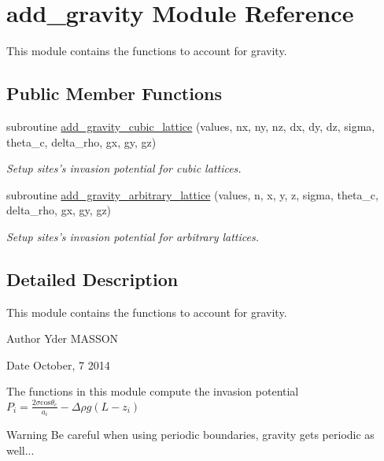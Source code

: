 \hypertarget{classadd__gravity}{
\section{add\-\_\-gravity \-Module \-Reference}
\label{classadd__gravity}
}


\-This module contains the functions to account for gravity.  


\subsection*{\-Public \-Member \-Functions}
\begin{DoxyCompactItemize}
\item 
subroutine \hyperlink{classadd__gravity_a6702f1e868d3906adf42156334fb1d69}{add\-\_\-gravity\-\_\-cubic\-\_\-lattice} (values, nx, ny, nz, dx, dy, dz, sigma, theta\-\_\-c, delta\-\_\-rho, gx, gy, gz)
\begin{DoxyCompactList}\small\item\em \-Setup sites's invasion potential for cubic lattices. \end{DoxyCompactList}\item 
subroutine \hyperlink{classadd__gravity_ad37593bf81aade45d5d57e92da031558}{add\-\_\-gravity\-\_\-arbitrary\-\_\-lattice} (values, n, x, y, z, sigma, theta\-\_\-c, delta\-\_\-rho, gx, gy, gz)
\begin{DoxyCompactList}\small\item\em \-Setup sites's invasion potential for arbitrary lattices. \end{DoxyCompactList}\end{DoxyCompactItemize}


\subsection{\-Detailed \-Description}
\-This module contains the functions to account for gravity. 

\begin{DoxyAuthor}{\-Author}
\-Yder \-M\-A\-S\-S\-O\-N 
\end{DoxyAuthor}
\begin{DoxyDate}{\-Date}
\-October, 7 2014
\end{DoxyDate}
\-The functions in this module compute the invasion potential $ P_i = \frac{2 \sigma \mbox{cos} \theta_c}{a_i}-\Delta \rho g (L-z_i)$ \begin{DoxyWarning}{\-Warning}
\-Be careful when using periodic boundaries, gravity gets periodic as well... 
\end{DoxyWarning}


